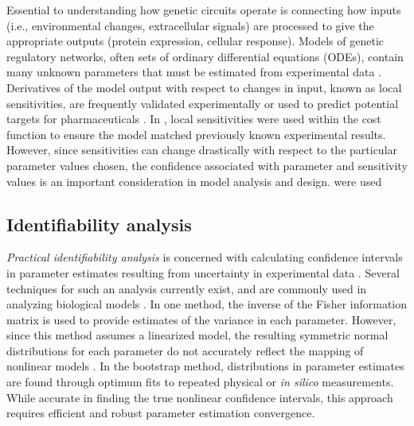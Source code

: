 Essential to understanding how genetic circuits operate is connecting how inputs (i.e., environmental changes, extracellular signals) are processed to give the appropriate outputs (protein expression, cellular response). 
Models of genetic regulatory networks, often sets of ordinary differential equations (ODEs), contain many unknown parameters that must be estimated from experimental data \cite{Gutenkunst2007}. 
Derivatives of the model output with respect to changes in input, known as local sensitivities, are frequently validated experimentally or used to predict potential targets for pharmaceuticals \cite{Kell2006}. 
In , local sensitivities were used within the cost function to ensure the model matched previously known experimental results.
However, since sensitivities can change drastically with respect to the particular parameter values chosen, the confidence associated with parameter and sensitivity values is an important consideration in model analysis and design.
 were used
\subsection{Identifiability analysis}

{\itshape Practical identifiability analysis} is concerned with calculating confidence intervals in parameter estimates resulting from uncertainty in experimental data \cite{Raue2009}. 
Several techniques for such an analysis currently exist, and are commonly used in analyzing biological models \cite{Nihtila1977, Jimenez-Hornero2009, Holmberg1982}. 
In one method, the inverse of the Fisher information matrix is used to provide estimates of the variance in each parameter. 
However, since this method assumes a linearized model, the resulting symmetric normal distributions for each parameter do not accurately reflect the mapping of nonlinear models \cite{Joshi2006}. 
In the bootstrap method, distributions in parameter estimates are found through optimum fits to repeated physical or {\itshape in silico} measurements. 
While accurate in finding the true nonlinear confidence intervals, this approach requires efficient and robust parameter estimation convergence.


